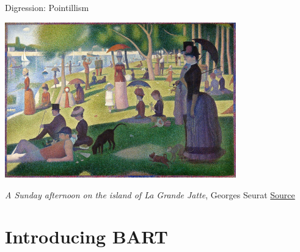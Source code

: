 \documentclass[aspectratio=199]{beamer}
\begin{document}
\begin{frame}{Digression: Pointillism}


\begin{center}
\includegraphics[width = 0.75\textwidth]{figures/seurat_full}
\end{center}

\textit{A Sunday afternoon on the island of La Grande Jatte}, Georges Seurat \href{https://commons.wikimedia.org/wiki/File:A_Sunday_on_La_Grande_Jatte,_Georges_Seurat,_1884.jpg}{Source}

\end{frame}

\section{Introducing BART}
\begin{frame}[noframenumbering]
\tableofcontents[currentsection]
\end{frame}
\end{document}
